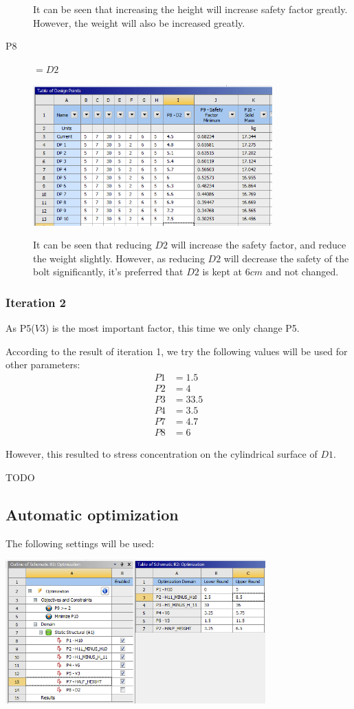 \documentclass[a4paper,14pt]{extarticle}
\begin{document}
\begin{description}
It can be seen that increasing the height will increase safety factor greatly. However, the weight will also be increased greatly.
\item[P8] $=D2$

\includegraphics[width=0.75\textwidth]{singleParam/P8.PNG}

It can be seen that reducing $D2$ will increase the safety factor, and reduce the weight slightly. However, as reducing $D2$ will decrease the safety of the bolt significantly, it's preferred that $D2$ is kept at $6cm$ and not changed.
\end{description}
\subsubsection{Iteration 2}
As P5($V3$) is the most important factor, this time we only change P5.

According to the result of iteration 1, we try the following values will be used for other parameters:
\begin{align*}
P1 &= 1.5\\
P2 &= 4\\
P3 &= 33.5\\
P4 &= 3.5\\
P7 &= 4.7\\
P8 &= 6
\end{align*}

However, this resulted to stress concentration on the cylindrical surface of $D1$. 

TODO

\subsection{Automatic optimization}
The following settings will be used:

\begin{center}
\includegraphics[width=0.75\textwidth]{OPT_BEFORE.PNG}
\end{center}
\end{document}
